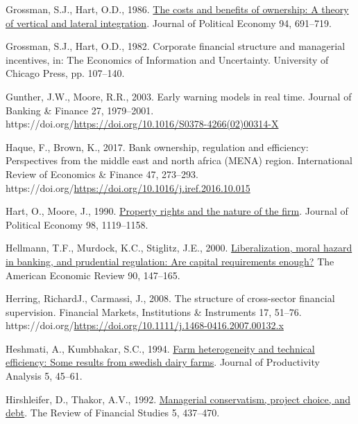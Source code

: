 \documentclass[
  12pt,
  a4paper,
]{scrreprt}
\newlength{\cslhangindent}
\newenvironment{CSLReferences}[2] %
 {\begin{list}{}{%
  \setlength{\itemindent}{0pt}
  \setlength{\leftmargin}{0pt}
  \setlength{\parsep}{0pt}
  \ifodd #1
   \setlength{\leftmargin}{\cslhangindent}
   \setlength{\itemindent}{-1\cslhangindent}
  \fi
  \setlength{\itemsep}{#2\baselineskip}}}
 {\end{list}}
\begin{document}
{{{{\begin{CSLReferences}{1}{0}
Grossman, S.J., Hart, O.D., 1986.
\href{http://www.jstor.org/stable/1833199}{The costs and benefits of
ownership: A theory of vertical and lateral integration}. Journal of
Political Economy 94, 691--719.

Grossman, S.J., Hart, O.D., 1982. Corporate financial structure and
managerial incentives, in: The Economics of Information and Uncertainty.
University of Chicago Press, pp. 107--140.

Gunther, J.W., Moore, R.R., 2003. Early warning models in real time.
Journal of Banking \& Finance 27, 1979--2001.
https://doi.org/\url{https://doi.org/10.1016/S0378-4266(02)00314-X}

Haque, F., Brown, K., 2017. Bank ownership, regulation and efficiency:
Perspectives from the middle east and north africa (MENA) region.
International Review of Economics \& Finance 47, 273--293.
https://doi.org/\url{https://doi.org/10.1016/j.iref.2016.10.015}

Hart, O., Moore, J., 1990.
\href{http://www.jstor.org/stable/2937753}{Property rights and the
nature of the firm}. Journal of Political Economy 98, 1119--1158.

Hellmann, T.F., Murdock, K.C., Stiglitz, J.E., 2000.
\href{http://www.jstor.org.queens.ezp1.qub.ac.uk/stable/117285}{Liberalization,
moral hazard in banking, and prudential regulation: Are capital
requirements enough?} The American Economic Review 90, 147--165.

Herring, RichardJ., Carmassi, J., 2008. The structure of cross-sector
financial supervision. Financial Markets, Institutions \& Instruments
17, 51--76.
https://doi.org/\url{https://doi.org/10.1111/j.1468-0416.2007.00132.x}

Heshmati, A., Kumbhakar, S.C., 1994.
\href{http://www.jstor.org/stable/41769891}{Farm heterogeneity and
technical efficiency: Some results from swedish dairy farms}. Journal of
Productivity Analysis 5, 45--61.

Hirshleifer, D., Thakor, A.V., 1992.
\href{http://www.jstor.org.queens.ezp1.qub.ac.uk/stable/2962134}{Managerial
conservatism, project choice, and debt}. The Review of Financial Studies
5, 437--470.


\end{CSLReferences}}}}}
\end{document}
